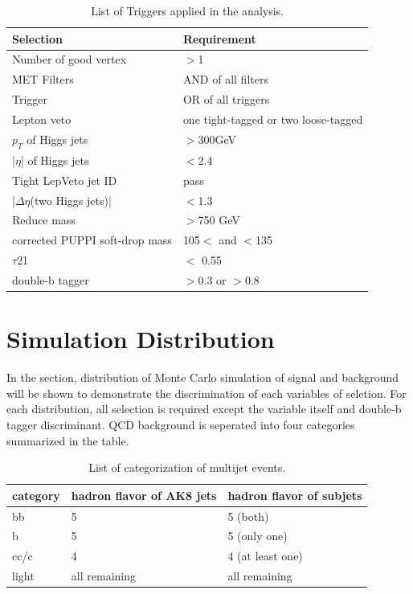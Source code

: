 \begin{table}[h!]
  \begin{center}
    \begin{tabular}{ll}
    Selection & Requirement \\
    \hline
    Number of good vertex & $>$1 \\
    MET Filters & AND of all filters\\
	Trigger & OR of all triggers\\
	Lepton veto & one tight-tagged or two loose-tagged \\
    $p_{T}$ of Higgs jets & $>$300GeV \\
	|$\eta$| of Higgs jets & $<$2.4 \\
	Tight LepVeto jet ID & pass \\
	|$\Delta \eta $(two Higgs jets)| & $<$1.3 \\
	Reduce mass & $>$750 GeV \\
	corrected PUPPI soft-drop mass & 105$<$ and $<$135 \\
	$\tau$21 & $<$ 0.55 \\
	double-b tagger & $>$0.3 or $>$0.8 \\
	\hline
    \end{tabular}
  \end{center}

  \caption{List of Triggers applied in the analysis.}
\end{table} 

\section{Simulation Distribution} 
In the section, distribution of Monte Carlo simulation of signal and background will be shown to demonstrate the discrimination of each variables of seletion. For each distribution, all selection is required except the variable itself and double-b tagger discriminant. QCD background is seperated into four categories summarized in the table. 

\begin{table}[h!]
  \begin{center}
    \begin{tabular}{lll}
    category & hadron flavor of AK8 jets & hadron flavor of subjets \\
    \hline
    bb & 5 & 5 (both) \\
    b & 5 & 5 (only one) \\
    cc/c & 4 & 4 (at least one) \\
    light & all remaining & all remaining \\
	\hline
    \end{tabular}
  \end{center}

  \caption{List of categorization of multijet events.}
\end{table} 

